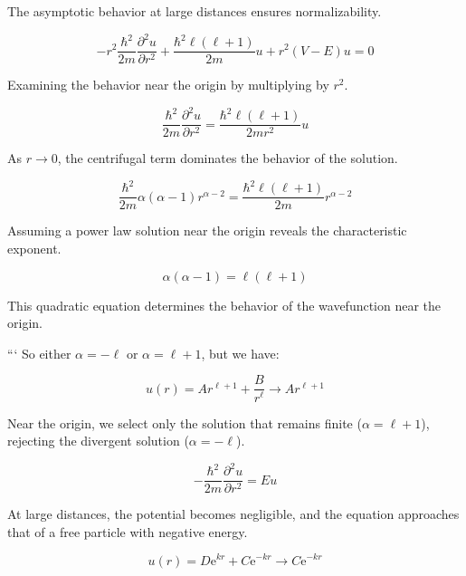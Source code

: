 \documentclass[10pt]{article}
\begin{document}
The asymptotic behavior at large distances ensures normalizability.

\begin{equation*}
-r^{2} \frac{\hbar^{2}}{2 m} \frac{\partial^{2} u}{\partial r^{2}}+\frac{\hbar^{2} \ell(\ell+1)}{2 m} u+r^{2}(V-E) u=0 \tag{9.40}
\end{equation*}

Examining the behavior near the origin by multiplying by $r^2$.

\begin{equation*}
\frac{\hbar^{2}}{2 m} \frac{\partial^{2} u}{\partial r^{2}}=\frac{\hbar^{2} \ell(\ell+1)}{2 m r^{2}} u \tag{9.41}
\end{equation*}

As $r \to 0$, the centrifugal term dominates the behavior of the solution.

\begin{equation*}
\frac{\hbar^{2}}{2 m} \alpha(\alpha-1) r^{\alpha-2}=\frac{\hbar^{2} \ell(\ell+1)}{2 m} r^{\alpha-2} \tag{9.42}
\end{equation*}

Assuming a power law solution near the origin reveals the characteristic exponent.

\begin{equation*}
\alpha(\alpha-1)=\ell(\ell+1) \tag{9.43}
\end{equation*}

This quadratic equation determines the behavior of the wavefunction near the origin.

```
So either $\alpha=-\ell$ or $\alpha=\ell+1$, but we have:

\begin{equation*}
u(r)=A r^{\ell+1}+\frac{B}{r^{\ell}} \rightarrow A r^{\ell+1} \tag{9.44}
\end{equation*}

Near the origin, we select only the solution that remains finite ($\alpha=\ell+1$), rejecting the divergent solution ($\alpha=-\ell$).

\begin{equation*}
-\frac{\hbar^{2}}{2 m} \frac{\partial^{2} u}{\partial r^{2}}=E u \tag{9.45}
\end{equation*}

At large distances, the potential becomes negligible, and the equation approaches that of a free particle with negative energy.

\begin{equation*}
u(r)=D \mathrm{e}^{k r}+C \mathrm{e}^{-k r} \rightarrow C \mathrm{e}^{-k r} \tag{9.46}
\end{equation*}
\end{document}
